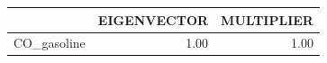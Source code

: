 \begin{tabular}{rrr}
  \hline
 & EIGENVECTOR & MULTIPLIER \\ 
  \hline
CO\_gasoline & 1.00 & 1.00 \\ 
   \hline
\end{tabular}
